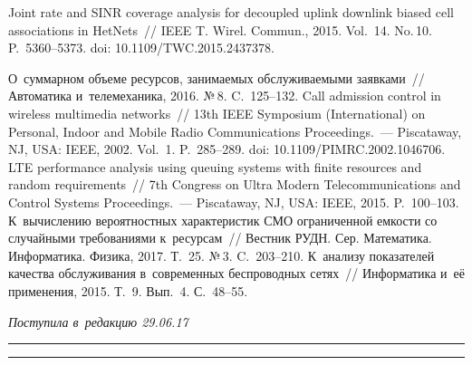 \begin{multicols}{2}
{{\begin{thebibliography}{99}
 Joint rate and SINR coverage analysis for 
decoupled uplink downlink biased cell associations in HetNets~// IEEE T. 
Wirel. Commun., 2015. Vol.~14. No.\,10. P.~5360--5373.
doi: 10.1109/TWC.2015.2437378.

 О~суммарном 
объеме ресурсов, занимаемых обслуживаемыми заявками~// Автоматика 
и~телемеханика, 2016. №\,8. C.~125--132.
 Call admission control in wireless multimedia 
networks~// 13th IEEE Symposium (International) on Personal, Indoor and 
Mobile Radio Communications Proceedings.~--- Piscataway, NJ, USA: IEEE, 
2002. Vol.~1. P.~285--289. doi: 10.1109/PIMRC.2002.1046706.
 LTE performance analysis using queuing systems with finite 
resources and random requirements~// 7th Congress on Ultra Modern 
Telecommunications and Control Systems Proceedings.~--- 
Piscataway, NJ, USA: IEEE, 2015. P.~100--103.
 К~вычислению вероятностных характеристик СМО 
ограниченной емкости со случайными требованиями к~ресурсам~// 
Вестник РУДН. Сер. Математика. Информатика. Физика, 2017. Т.~25. 
№\,3. C.~203--210.
К~анализу показателей качества обслуживания в~современных 
беспроводных сетях~// Информатика и~её применения, 2015. Т.~9. Вып.~4. 
С.~48--55. 
 \end{thebibliography}

 }
 }

\end{multicols}

\vspace*{-3pt}

\hfill{\small\textit{Поступила в~редакцию 29.06.17}}

\vspace*{8pt}



\hrule

\vspace*{2pt}

\hrule



\def\tit{QUEUING SYSTEMS WITH~RESOURCES AND~SIGNALS 
AND~THEIR~APPLICATION FOR~PERFORMANCE 
EVALUATION OF~WIRELESS NETWORKS}


